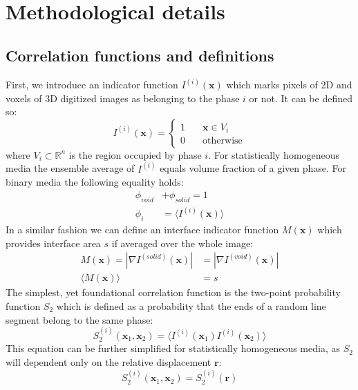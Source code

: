 \documentclass[reprint,amsmath,amssymb,aps,pre]{revtex4-1}
\begin{document}
\section{Methodological details}
\label{sec:details}
\subsection{Correlation functions and definitions}
First, we introduce an indicator function $I^{(i)}(\mathbf{x})$ which marks
pixels of 2D and voxels of 3D digitized images as belonging to the phase $i$ or
not. It can be defined so:
\begin{equation*}
  I^{(i)}(\mathbf{x}) = \left\{
  \begin{array}{ll}
    1 & \quad \mathbf{x} \in V_i \\
    0 & \quad \text{otherwise}
  \end{array}
  \right.
\end{equation*}
where $V_i \subset \mathbb{R}^n$ is the region occupied by phase $i$. For
statistically homogeneous media the ensemble average of $I^{(i)}$ equals volume
fraction of a given phase. For binary media the following equality holds:
\begin{align*}
  \phi_{void} &+ \phi_{solid} = 1 \\
  \phi_i &= \langle I^{(i)}(\mathbf{x}) \rangle
\end{align*}
In a similar fashion we can define an interface indicator function
$M(\mathbf{x})$ which provides interface area $s$ if averaged over the whole
image:
\begin{align}
  M(\mathbf{x}) = |\nabla I^{(solid)}(\mathbf{x})| &= |\nabla I^{(void)}(\mathbf{x})|
  \label{eq:interface} \\
  \langle M(\mathbf{x}) \rangle &= s
\end{align}
The simplest, yet foundational correlation function is the two-point probability
function $S_2$ which is defined as a probability that the ends of a random line
segment belong to the same phase:
\begin{equation}
  S_2^{(i)}(\mathbf{x}_1, \mathbf{x}_2) = \langle I^{(i)}(\mathbf{x}_1)
  I^{(i)}(\mathbf{x}_2) \rangle \label{eq:twopoint}
\end{equation}
This equation can be further simplified for statistically homogeneous media, as
$S_2$ will dependent only on the relative displacement $\mathbf{r}$:
\begin{equation*}
  S_2^{(i)}(\mathbf{x}_1, \mathbf{x}_2) = S_2^{(i)}(\mathbf{r})
\end{equation*}
\end{document}
